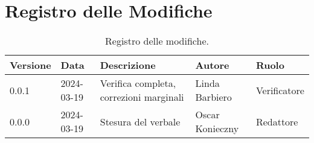 \section*{Registro delle Modifiche}
\begin{table}[ht!]	
		\centering
		\begin{tabular}{p{1.2cm} p{2cm} p{6cm} p{3cm} p{2cm}}
			\toprule
			\textbf{Versione}& \textbf{Data} & \textbf{Descrizione} & \textbf{Autore} & \textbf{Ruolo} \\
			\midrule
			0.0.1 & 2024-03-19 & Verifica completa, correzioni marginali  & Linda Barbiero & Verificatore \\
			0.0.0 & 2024-03-19 & Stesura del verbale  & Oscar Konieczny & Redattore \\
			\bottomrule
		\end{tabular}
		\caption{Registro delle modifiche.}
		\label{table:Registro delle modifiche}
\end{table}
